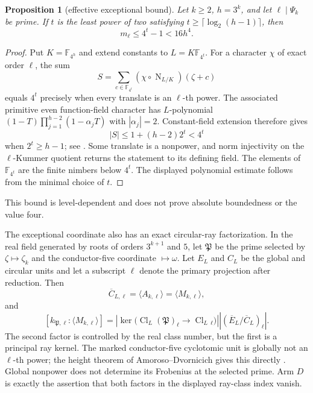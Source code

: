 \documentclass[11pt]{article}
\newtheorem{proposition}[theorem]{Proposition}
\theoremstyle{definition}
\theoremstyle{remark}
\begin{document}
\begin{proposition}[effective exceptional bound]\label{prop:d-bound}
Let $k\geq2$, $h=3^k$, and let $\ell\mid\Psi_k$ be prime.  If $t$ is the
least power of two satisfying
$t\geq\lceil\log_2(h-1)\rceil$, then
\[
  m_\ell\leq4^t-1<16h^4.
\]
\end{proposition}

\begin{proof}
Put $K=\mathbb F_{4^h}$ and extend constants to
$L=K\mathbb F_{4^t}$.  For a character $\chi$ of exact order $\ell$, the
sum
\[
  S=\sum_{c\in\mathbb F_{4^t}}
      (\chi\circ\operatorname N_{L/K})(\zeta+c)
\]
equals $4^t$ precisely when every translate is an $\ell$-th power.  The
associated primitive even function-field character has $L$-polynomial
$(1-T)\prod_{j=1}^{h-2}(1-\alpha_jT)$ with $|\alpha_j|=2$.  Constant-field
extension therefore gives
\[
  |S|\leq1+(h-2)2^t<4^t
\]
when $2^t\geq h-1$; see \cite{rosen2002}.  Some translate is a nonpower,
and norm injectivity on the $\ell$-Kummer quotient returns the statement to
its defining field.  The elements of $\mathbb F_{4^t}$ are the finite
nimbers below $4^t$.  The displayed polynomial estimate follows from the
minimal choice of $t$.
\end{proof}

This bound is level-dependent and does not prove absolute boundedness or the
value four.

The exceptional coordinate also has an exact circular-ray factorization.
In the real field generated by roots of orders $3^{k+1}$ and $5$, let
$\mathfrak P$ be the prime selected by $\zeta\mapsto\zeta_k$ and the
conductor-five coordinate $\mapsto\omega$.  Let $E_L$ and $C_L$ be the
global and circular units and let a subscript $\ell$ denote the primary
projection after reduction.  Then
\[
 \overline C_{L,\ell}
 =\langle A_{k,\ell}\rangle
 =\langle M_{k,\ell}\rangle,
\]
and
\[
 [k_{\mathfrak P,\ell}:\langle M_{k,\ell}\rangle]
 =\left|\ker\bigl(
   \operatorname{Cl}_L(\mathfrak P)_\ell\to
   \operatorname{Cl}_L{}_{\ell}\bigr)\right|
  |(\overline E_L/\overline C_L)_\ell|.
\]
The second factor is controlled by the real class number, but the first is a
principal ray kernel.  The marked conductor-five cyclotomic unit is globally
not an $\ell$-th power; the height theorem of Amoroso--Dvornicich gives this
directly \cite{amorosodvornicich2000}.  Global nonpower does not determine
its Frobenius at the selected prime.  Arm $D$ is exactly the assertion that
both factors in the displayed ray-class index vanish.
\end{document}
